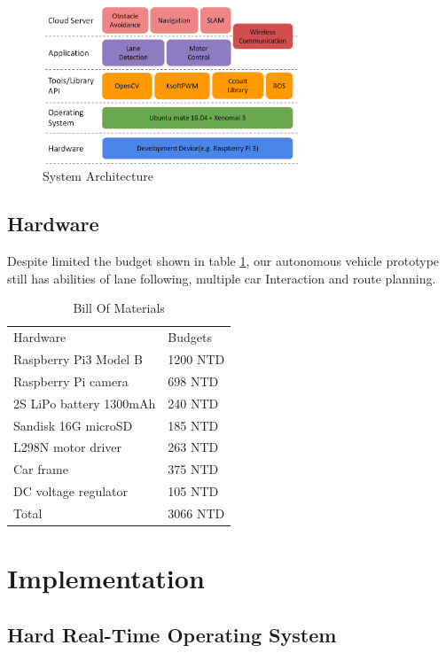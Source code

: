 \documentclass[conference]{IEEEtran}
\begin{document}
\begin{figure}
	\centering
	\includegraphics[width=3in]{img/arch.png}
	\caption{System Architecture}
	\label{fig:overall_arch}
\end{figure}

\subsection{Hardware}

Despite limited the budget shown in table \ref{hardware_list}, our autonomous vehicle prototype still has abilities of lane following, multiple car Interaction and route planning.

\begin{table}
	\centering
	\caption{Bill Of Materials}
	\label{hardware_list}
	\begin{tabular}{ll}
		Hardware                & Budgets  \\
		Raspberry Pi3 Model B   & 1200 NTD \\
		Raspberry Pi camera     & 698 NTD  \\
		2S LiPo battery 1300mAh & 240 NTD  \\
		Sandisk 16G microSD     & 185 NTD  \\
		L298N motor driver      & 263 NTD  \\
		Car frame               & 375 NTD  \\
		DC voltage regulator    & 105 NTD  \\
		Total                   & 3066 NTD
	\end{tabular}
\end{table}

\section{Implementation}

\subsection{Hard Real-Time Operating System}
\end{document}
